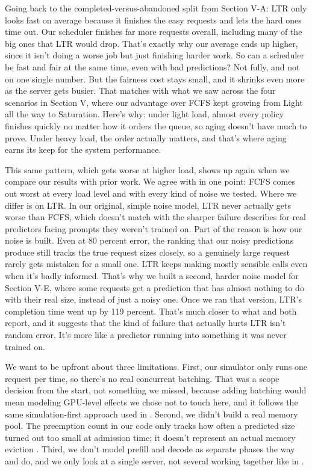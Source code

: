 Going back to the completed-versus-abandoned split from Section V-A: LTR only looks fast on average because it finishes the easy requests and lets the hard ones time out. Our scheduler finishes far more requests overall, including many of the big ones that LTR would drop. That's exactly why our average ends up higher, since it isn't doing a worse job but just finishing harder work. So can a scheduler be fast and fair at the same time, even with bad predictions? Not fully, and not on one single number. But the fairness cost stays small, and it shrinks even more as the server gets busier. That matches with what we saw across the four scenarios in Section V, where our advantage over FCFS kept growing from Light all the way to Saturation. Here's why: under light load, almost every policy finishes quickly no matter how it orders the queue, so aging doesn't have much to prove. Under heavy load, the order actually matters, and that's where aging earns its keep for the system performance.

This same pattern, which gets worse at higher load, shows up again when we compare our results with prior work. We agree with \cite{kumar2024latency} in one point: FCFS comes out worst at every load level and with every kind of noise we tested. Where we differ is on LTR. In our original, simple noise model, LTR never actually gets worse than FCFS, which doesn't match with the sharper failure \cite{kumar2024latency} describes for real predictors facing prompts they weren't trained on. Part of the reason is how our noise is built. Even at 80 percent error, the ranking that our noisy predictions produce still tracks the true request sizes closely, so a genuinely large request rarely gets mistaken for a small one. LTR keeps making mostly sensible calls even when it's badly informed. That's why we built a second, harder noise model for Section V-E, where some requests get a prediction that has almost nothing to do with their real size, instead of just a noisy one. Once we ran that version, LTR's completion time went up by 119 percent. That's much closer to what \cite{kumar2024latency} and \cite{fu2024ltr} both report, and it suggests that the kind of failure that actually hurts LTR isn't random error. It's more like a predictor running into something it was never trained on.

We want to be upfront about three limitations. First, our simulator only runs one request per time, so there's no real concurrent batching. That was a scope decision from the start, not something we missed, because adding batching would mean modeling GPU-level effects we chose not to touch here, and it follows the same simulation-first approach used in \cite{agrawal2024vidur}. Second, we didn't build a real memory pool. The preemption count in our code only tracks how often a predicted size turned out too small at admission time; it doesn't represent an actual memory eviction \cite{kwon2023pagedattention}. Third, we don't model prefill and decode as separate phases the way \cite{sheng2024fairness} and \cite{patel2024splitwise} do, and we only look at a single server, not several working together like in \cite{sun2024llumnix}.

